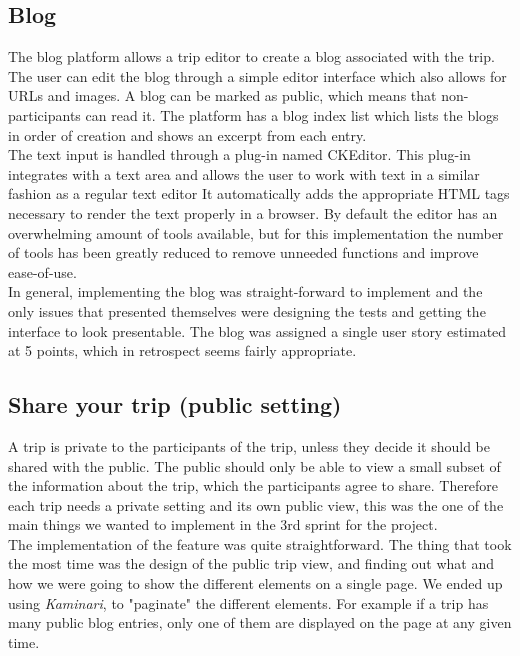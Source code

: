 \documentclass[a4paper]{article}
\begin{document}
\subsection{Blog}
The blog platform allows a trip editor to create a blog associated with the trip. The user can edit the blog through a simple editor interface which also allows for URLs and images. A blog can be marked as public, which means that non-participants can read it. The platform has a blog index list which lists the blogs in order of creation and shows an excerpt from each entry.\\

\noindent
The text input is handled through a plug-in named CKEditor\cite{ckeditor}. This plug-in integrates with a text area and allows the user to work with text in a similar fashion as a regular text editor It automatically adds the appropriate HTML tags necessary to render the text properly in a browser. By default the editor has an overwhelming amount of tools available, but for this implementation the number of tools has been greatly reduced to remove unneeded functions and improve ease-of-use.\\

\noindent
In general, implementing the blog was straight-forward to implement and the only issues that presented themselves were designing the tests and getting the interface to look presentable. The blog was assigned a single user story estimated at 5 points, which in retrospect seems fairly appropriate.

\subsection{Share your trip (public setting)}
A trip is private to the participants of the trip, unless they decide it should be shared with the public. The public should only be able to view a small subset of the information about the trip, which the participants agree to share. Therefore each trip needs a private setting and its own public view, this was the one of the main things we wanted to implement in the 3rd sprint for the project. \\

\noindent
The implementation of the feature was quite straightforward. The thing that took the most time was the design of the public trip view, and finding out what and how we were going to show the different elements on a single page. We ended up using \emph{Kaminari}\cite{kaminari}, to "paginate" the different elements. For example if a trip has many public blog entries, only one of them are displayed on the page at any given time. 
\end{document}
